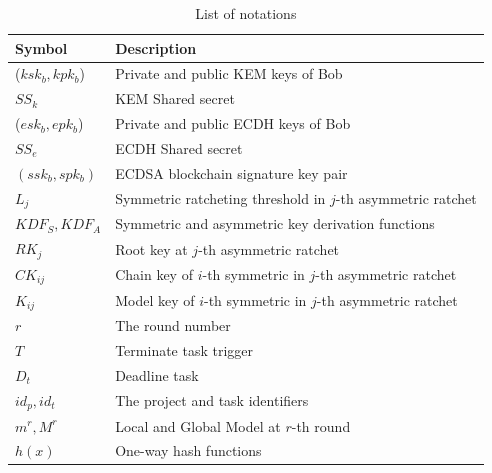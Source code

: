 \documentclass[a4paper,fleqn]{cas-dc}
\begin{document}

\begin{table}
\small
\centering
\caption{List of notations}
\label{tab: Notations}
\begin{adjustbox}{width=3.2in}
\begin{tabular}{l|l}
\hline
\rowcolor[HTML]{EFEFEF} 
Symbol                 & Description                                                 \\\hline
($ksk_{b},kpk_{b}$)    & Private and public KEM keys of Bob                          \\[0.8ex]
$SS_{k}$               & KEM Shared secret                                           \\[0.8ex] 
($esk_{b},epk_{b}$)    & Private and public ECDH keys of Bob                         \\[0.8ex]
$SS_{e}$               & ECDH Shared secret                                          \\[0.8ex]
$(ssk_{b},spk_{b})$    & ECDSA blockchain signature key pair                         \\[0.8ex]
$L_{j}$                & Symmetric ratcheting threshold in $j$-th asymmetric ratchet             \\[0.8ex]
$KDF_{S},KDF_{A}$      & Symmetric and asymmetric key derivation functions           \\[0.8ex]
$RK_{j}$               & Root key at $j$-th asymmetric ratchet                       \\[0.8ex]
$CK_{ij}$              & Chain key of $i$-th symmetric in $j$-th asymmetric ratchet  \\[0.8ex]
$K_{ij}$               & Model key of $i$-th symmetric in $j$-th asymmetric ratchet  \\[0.8ex]
$r$                    & The round number                                            \\[0.8ex]
$T$                    & Terminate task trigger                                      \\[0.8ex]
$D_{t}$                & Deadline task                                               \\[0.8ex]
$id_{p},id_{t}$        & The project and task identifiers                             \\[0.8ex]
$m^{r},M^{r}$          & Local and Global Model at $r$-th round                      \\[0.8ex]
$h(x)$                 & One-way hash functions                                      \\ \hline
\end{tabular}
\end{adjustbox}
\end{table}
\end{document}

